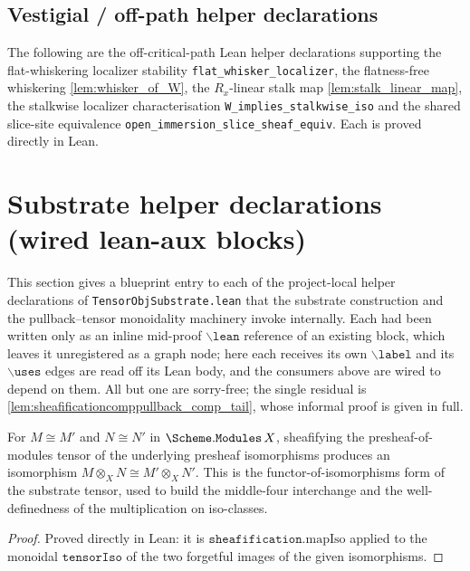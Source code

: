 \subsection{Vestigial / off-path helper declarations}
\label{subsec:tensorobj_vestigial_helpers}

The following are the off-critical-path Lean helper declarations supporting the
flat-whiskering localizer stability \texttt{flat\_whisker\_localizer}, the
flatness-free whiskering \cref{lem:whisker_of_W}, the \(R_x\)-linear stalk map
\cref{lem:stalk_linear_map}, the stalkwise localizer characterisation
\texttt{W\_implies\_stalkwise\_iso} and the shared slice-site equivalence
\texttt{open\_immersion\_slice\_sheaf\_equiv}. Each is proved directly in Lean.

\section{Substrate helper declarations (wired lean-aux blocks)}
\label{sec:tensorobj_substrate_helpers}

This section gives a blueprint entry to each of the project-local helper declarations
of \texttt{TensorObjSubstrate.lean} that the substrate construction and the
pullback--tensor monoidality machinery invoke internally. Each had been written only
as an inline mid-proof \(\mathtt{\backslash lean}\) reference of an existing block,
which leaves it unregistered as a graph node; here each receives its own \(\mathtt{\backslash label}\)
and its \(\mathtt{\backslash uses}\) edges are read off its Lean body, and the consumers
above are wired to depend on them. All but one are sorry-free; the single residual is
\cref{lem:sheafificationcomppullback_comp_tail}, whose informal proof is given in full.

\begin{definition}
  \label{def:tensorobjisoofiso}
  For \(M \cong M'\) and \(N \cong N'\) in \(\Scheme.\mathtt{Modules}\,X\), sheafifying the
  presheaf-of-modules tensor of the underlying presheaf isomorphisms produces an
  isomorphism \(M \otimes_X N \cong M' \otimes_X N'\). This is the functor-of-isomorphisms
  form of the substrate tensor, used to build the middle-four interchange and the
  well-definedness of the multiplication on iso-classes.
\end{definition}
\begin{proof}
  \leanok
  Proved directly in Lean: it is \(\mathtt{sheafification}.\mathrm{mapIso}\) applied to the
  monoidal \(\mathtt{tensorIso}\) of the two forgetful images of the given isomorphisms.
\end{proof}

